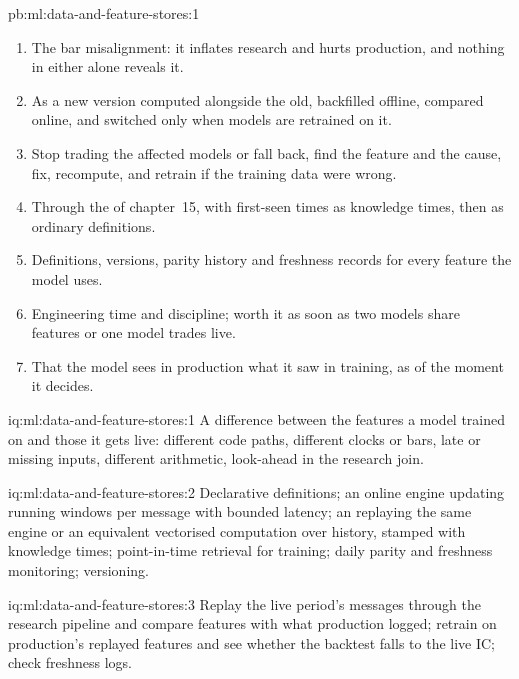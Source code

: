\begin{solution}{pb:ml:data-and-feature-stores:1}
\begin{enumerate}[resume]
delivers 0.360 live against 0.411 for the clean pipeline, with P\&L per decision falling from 0.089 to 0.078 ticks; a
five-decision parity check catches each of the four planted skews every time.
\item The bar misalignment: it inflates research and hurts production, and nothing in either alone reveals it.
\item As a new version computed alongside the old, backfilled offline, compared online, and switched only when models are
retrained on it.
\item Stop trading the affected models or fall back, find the feature and the cause, fix, recompute, and retrain if the
training data were wrong.
\item Through the  of chapter~15, with first-seen times as knowledge times, then as ordinary definitions.
\item Definitions, versions, parity history and freshness records for every feature the model uses.
\item Engineering time and discipline; worth it as soon as two models share features or one model trades live.
\item That the model sees in production what it saw in training, as of the moment it decides.
\end{enumerate}
\end{solution}

\begin{solution}{iq:ml:data-and-feature-stores:1}
A difference between the features a model trained on and those it gets live: different code paths, different clocks or bars,
late or missing inputs, different arithmetic, look-ahead in the research join.
\end{solution}

\begin{solution}{iq:ml:data-and-feature-stores:2}
Declarative definitions; an online engine updating running windows per message with bounded latency; an 
replaying the same engine or an equivalent vectorised computation over history, stamped with knowledge times; point-in-time
retrieval for training; daily parity and freshness monitoring; versioning.
\end{solution}

\begin{solution}{iq:ml:data-and-feature-stores:3}
Replay the live period's messages through the research pipeline and compare features with what production logged; retrain on
production's replayed features and see whether the backtest falls to the live IC; check freshness logs.
\end{solution}

